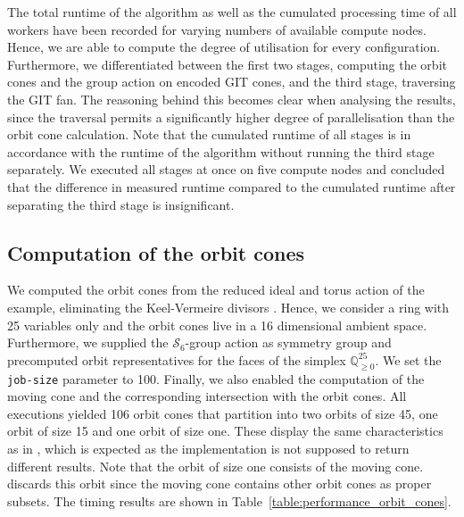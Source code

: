 The total runtime of the algorithm as well as the cumulated processing time of all workers have been recorded for varying numbers of available compute nodes. Hence, we are able to compute the degree of utilisation for every configuration. Furthermore, we differentiated between the first two stages, computing the orbit cones and the group action on encoded GIT cones, and the third stage, traversing the GIT fan. The reasoning behind this becomes clear when analysing the results, since the traversal permits a significantly higher degree of parallelisation than the orbit cone calculation. Note that the cumulated runtime of all stages is in accordance with the runtime of the algorithm without running the third stage separately. We executed all stages at once on five compute nodes and concluded that the difference in measured runtime compared to the cumulated runtime after separating the third stage is insignificant.

\subsection*{Computation of the orbit cones}

We computed the orbit cones from the reduced ideal and torus action of the \msix{} example, eliminating the Keel-Vermeire divisors . Hence, we consider a ring with 25 variables only and the orbit cones live in a 16 dimensional ambient space. Furthermore, we supplied the $\mathcal{S}_6$-group action as symmetry group and precomputed orbit representatives for the faces of the simplex $\mathbb{Q}_{\geq 0}^{25}$. We set the \texttt{job-size} parameter to 100. Finally, we also enabled the computation of the moving cone and the corresponding intersection with the orbit cones.  All executions yielded 106 orbit cones that partition into two orbits of size 45, one orbit of size 15 and one orbit of size one. These display the same characteristics as in \cite[Remark 6.7]{gitfan_symmetry}, which is expected as the \gitfanlib{} implementation is not supposed to return different results. Note that the orbit of size one consists of the moving cone. \gitfanlib{} discards this orbit since the moving cone contains other orbit cones as proper subsets. The timing results are shown in Table~\ref{table:performance_orbit_cones}.

